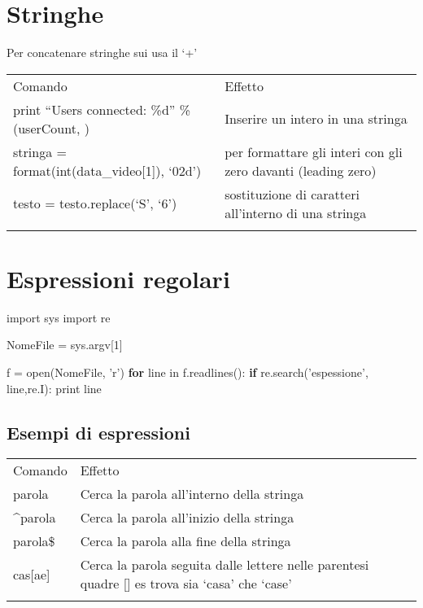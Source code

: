 \documentclass[]{article}
\newenvironment{Shaded}{}{}
\newcommand{\KeywordTok}[1]{\textcolor[rgb]{0.00,0.44,0.13}{\textbf{{#1}}}}
\newcommand{\DataTypeTok}[1]{\textcolor[rgb]{0.56,0.13,0.00}{{#1}}}
\newcommand{\DecValTok}[1]{\textcolor[rgb]{0.25,0.63,0.44}{{#1}}}
\newcommand{\CharTok}[1]{\textcolor[rgb]{0.25,0.44,0.63}{{#1}}}
\newcommand{\StringTok}[1]{\textcolor[rgb]{0.25,0.44,0.63}{{#1}}}
\newcommand{\NormalTok}[1]{{#1}}
\begin{document}
\section{Stringhe}\label{stringhe}

Per concatenare stringhe sui usa il `+'

\begin{longtable}[l]{@{}ll@{}}
\toprule\addlinespace
Comando & Effetto
\\\addlinespace
\midrule\endhead
print ``Users connected: \%d'' \% (userCount, ) & Inserire un intero in
una stringa
\\\addlinespace
stringa = format(int(data\_video{[}1{]}), `02d') & per formattare gli
interi con gli zero davanti (leading zero)
\\\addlinespace
testo = testo.replace(`S', `6') & sostituzione di caratteri all'interno
di una stringa
\\\addlinespace
\bottomrule
\end{longtable}

\section{Espressioni regolari}\label{espressioni-regolari}

\begin{Shaded}
\begin{Highlighting}[]
\CharTok{import} \NormalTok{sys}
\CharTok{import} \NormalTok{re}

\NormalTok{NomeFile = sys.argv[}\DecValTok{1}\NormalTok{]}

\NormalTok{f = }\DataTypeTok{open}\NormalTok{(NomeFile, }\StringTok{'r'}\NormalTok{)}
\KeywordTok{for} \NormalTok{line in f.readlines():}
    \KeywordTok{if} \NormalTok{re.search(}\StringTok{'espessione'}\NormalTok{, line,re.I):}
        \DataTypeTok{print} \NormalTok{line}
\end{Highlighting}
\end{Shaded}

\subsection{Esempi di espressioni}\label{esempi-di-espressioni}

\begin{longtable}[l]{@{}ll@{}}
\toprule\addlinespace
Comando & Effetto
\\\addlinespace
\midrule\endhead
parola & Cerca la parola all'interno della stringa
\\\addlinespace
\^{}parola & Cerca la parola all'inizio della stringa
\\\addlinespace
parola\$ & Cerca la parola alla fine della stringa
\\\addlinespace
cas{[}ae{]} & Cerca la parola seguita dalle lettere nelle parentesi
quadre {[}{]} es trova sia `casa' che `case'
\\\addlinespace
\bottomrule
\end{longtable}
\end{document}
